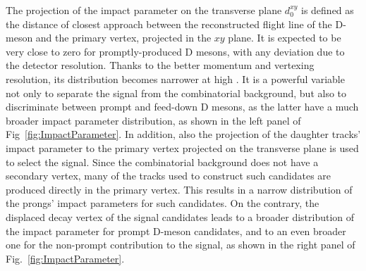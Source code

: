 The projection of the impact parameter on the transverse plane $d_0^{xy}$ is defined as the distance of closest approach between the reconstructed flight line of the D-meson and the primary vertex, projected in the $xy$ plane. It is expected to be very close to zero for promptly-produced D mesons, with any deviation due to the detector resolution. Thanks to the better momentum and vertexing resolution, its distribution becomes narrower at high \pt. It is a powerful variable not only to separate the signal from the combinatorial background, but also to discriminate between prompt and feed-down D mesons, as the latter have a much broader impact parameter distribution, as shown in the left panel of Fig~\ref{fig:ImpactParameter}. In addition, also the projection of the daughter tracks' impact parameter to the primary vertex projected on the transverse plane is used to select the signal. Since the combinatorial background does not have a secondary vertex, many of the tracks used to construct such candidates are produced directly in the primary vertex. This results in a narrow distribution of the prongs' impact parameters for such candidates. On the contrary, the displaced decay vertex of the signal candidates leads to a broader distribution of the impact parameter for prompt D-meson candidates, and to an even broader one for the non-prompt contribution to the signal, as shown in the right panel of Fig.~\ref{fig:ImpactParameter}.


